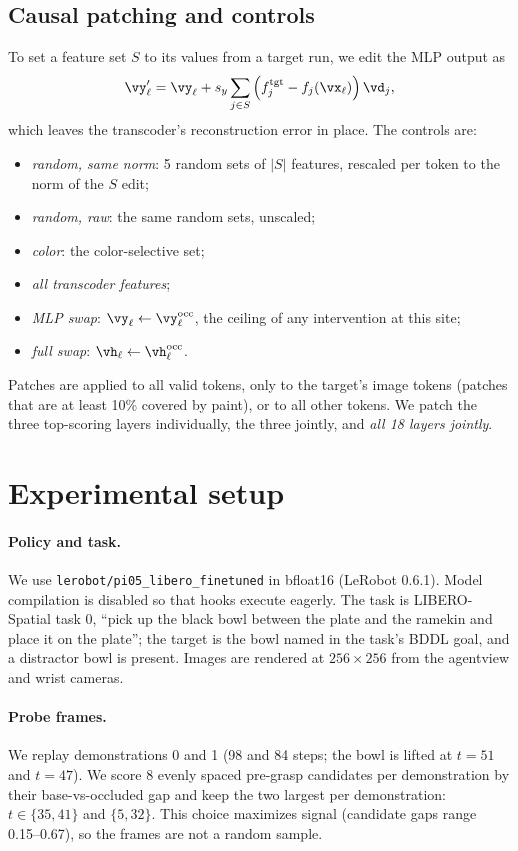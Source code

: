 \documentclass{article} %
\begin{document}
\subsection{Causal patching and controls}
To set a feature set $S$ to its values from a target run, we edit the MLP output as
\begin{equation}
  \vy'_\ell = \vy_\ell + s_y\sum_{j\in S}\left(f_j^{\text{tgt}}-f_j(\vx_\ell)\right)\vd_j ,
\end{equation}
which leaves the transcoder's reconstruction error in place. The controls are:
\begin{itemize}[leftmargin=*,itemsep=0pt,topsep=1pt]
  \item \emph{random, same norm}: 5 random sets of $|S|$ features, rescaled per token to the norm of the $S$ edit;
  \item \emph{random, raw}: the same random sets, unscaled;
  \item \emph{color}: the color-selective set;
  \item \emph{all transcoder features};
  \item \emph{MLP swap}: $\vy_\ell\leftarrow\vy_\ell^{\text{occ}}$, the ceiling of any intervention at this site;
  \item \emph{full swap}: $\vh_\ell\leftarrow\vh_\ell^{\text{occ}}$.
\end{itemize}
Patches are applied to all valid tokens, only to the target's image tokens (patches that are at least 10\% covered by paint), or to all other tokens. We patch the three top-scoring layers individually, the three jointly, and \emph{all 18 layers jointly}.

\section{Experimental setup}
\label{sec:setup}
\paragraph{Policy and task.} We use \texttt{lerobot/pi05\_libero\_finetuned} in bfloat16 (LeRobot 0.6.1). Model compilation is disabled so that hooks execute eagerly. The task is LIBERO-Spatial task 0, ``pick up the black bowl between the plate and the ramekin and place it on the plate''; the target is the bowl named in the task's BDDL goal, and a distractor bowl is present. Images are rendered at $256\times256$ from the agentview and wrist cameras.

\paragraph{Probe frames.} We replay demonstrations 0 and 1 (98 and 84 steps; the bowl is lifted at $t{=}51$ and $t{=}47$). We score 8 evenly spaced pre-grasp candidates per demonstration by their base-vs-occluded gap and keep the two largest per demonstration: $t\in\{35,41\}$ and $\{5,32\}$. This choice maximizes signal (candidate gaps range 0.15--0.67), so the frames are not a random sample.
\end{document}
